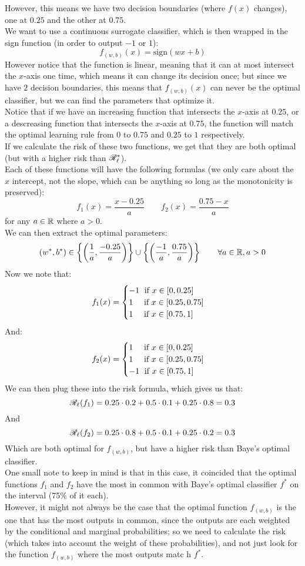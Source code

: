 \documentclass[12pt]{article}
\begin{document}
\begin{enumerate}[label = \alph*)]
However, this means we have two
decision boundaries (where $f(x)$
changes),
one at $0.25$ and the other at $0.75$. \\
We want to use a continuous
surrogate classifier,
which is then wrapped in the sign function
(in order to output $-1$ or $1$):
\[ f_{(w, b)}(x) = \text{sign}(wx + b) \]
However notice that the function is
linear, meaning that it can at most
intersect the $x$-axis one time,
which means it can change its decision
once;
but since we have $2$ decision boundaries,
this means that $f_{(w, b)}(x)$
can never be the optimal classifier,
but we can find the parameters that
optimize it. \\
Notice that if we have 
an increasing function that intersects
the $x$-axis at $0.25$,
or a descreasing function
that intersects
the $x$-axis at $0.75$,
the function will match the optimal
learning rule from $0$ to $0.75$
and $0.25$ to $1$ respectively. \\
If we calculate the risk of these
two functions, we get that they are
both optimal (but with a higher risk
than $\mathscr{R}_\ell^*$). \\
Each of these functions will have the
following formulas
(we only care about the $x$
intercept, not the slope,
which can be anything so long
as the monotonicity is preserved):
\[ f_1(x) = \dfrac{x-0.25}{a} \qquad
f_2(x) = \dfrac{0.75 - x}{a} \]
for any $a \in \mathbb{R}$ where $a > 0$. \\
We can then extract the optimal
parameters:
\[ (w^*, b^*) \in
\left\{ \left( \dfrac{1}{a}, \dfrac{-0.25}{a} \right) \right\}
\cup
\left\{ \left( \dfrac{-1}{a}, \dfrac{0.75}{a} \right) \right\}
\qquad \forall a \in \mathbb{R}, a > 0 \]
Now we note that:
\[ f_1(x)
= \begin{cases} -1 \; \text{ if } x \in [0, 0.25] \\ 1 \quad \text{ if } x \in [0.25, 0.75] \\ 1 \quad \text{ if } x \in [0.75, 1] \end{cases} \]
And:
\[ f_2(x)
= \begin{cases} 1 \quad \text{ if } x \in [0, 0.25] \\ 1 \quad \text{ if } x \in [0.25, 0.75] \\ -1 \; \text{ if } x \in [0.75, 1] \end{cases} \]
We can then plug these into
the risk formula,
which gives us that:
\[ \mathscr{R}_\ell(f_1)
= 0.25 \cdot 0.2 + 0.5 \cdot 0.1
+ 0.25 \cdot 0.8 = 0.3 \]
And
\[ \mathscr{R}_\ell(f_2)
= 0.25 \cdot 0.8 + 0.5 \cdot 0.1
+ 0.25 \cdot 0.2 = 0.3 \]
Which are both optimal
for $f_{(w, b)}$,
but have a higher risk than
Baye's optimal classifier. \\
One small note to keep in mind is that
in this case, it coincided that the
optimal functions $f_1$
and $f_2$ have the most
in common with Baye's optimal
classifier $f^*$
on the interval (75\% of it each). \\
However, it might not always be the case
that the optimal function
$f_{(w, b)}$
is the one that has the most
outputs in common,
since the outputs are each
weighted by the conditional and marginal
probabilities;
so we need to calculate the risk
(which takes into account
the weight of these probabilities),
and not just look for the function
$f_{(w, b)}$ where the most outputs
matc h $f^*$. 
\end{enumerate}
\end{document}
